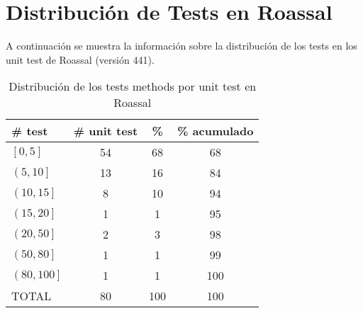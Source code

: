 \chapter{Distribución de Tests en Roassal}

\par A continuación se muestra la información sobre la distribución de los tests en los unit test de Roassal (versión 441).

\vspace*{3cm}
\begin{table}[H] 
    \centering 
    \begin{tabular}{|l|c|c|c|}
        \hline
        \textbf{\# test} & \textbf{\# unit test} & \textbf{\%} & \textbf{\% acumulado} \\ \hline\hline
        $\left[ 0,5 \right]$    & 54    &68 & 68 \\ \hline
        $\left( 5,10 \right]$   & 13    &16 & 84 \\ \hline
        $\left( 10,15 \right]$  & 8 &10 & 94 \\ \hline
        $\left( 15,20 \right]$  & 1 &1  & 95 \\ \hline
        $\left( 20,50 \right]$  & 2 &3  & 98 \\ \hline
        $\left( 50,80 \right]$  & 1 &1  & 99  \\\hline
        $\left( 80,100 \right]$ & 1 &1  & 100 \\ \hline \hline
        TOTAL   & 80    &100  & 100  \\ \hline
    \end{tabular}
    \caption{Distribución de los tests methods por unit test en Roassal}
\end{table} 

\clearpage

